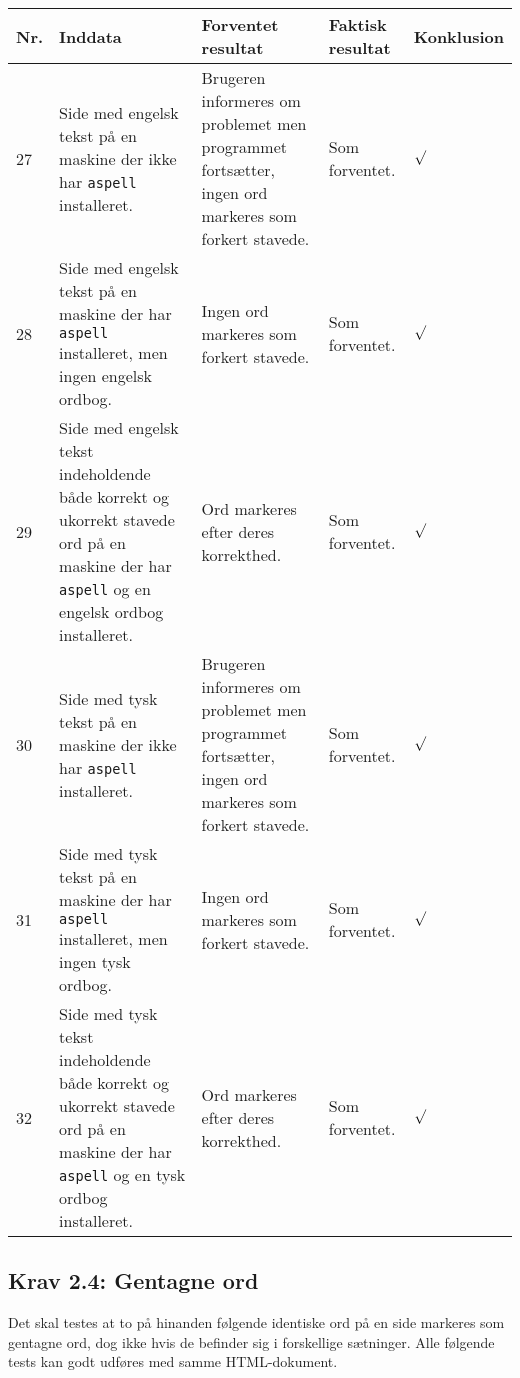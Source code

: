 \documentclass[a4paper,oneside,article]{memoir}
\begin{document}
\begin{landscape}
\begin{longtable}[c]{p{20pt}|p{220pt}|p{130pt}|p{130pt}|p{50pt}}
\textbf{Nr.} &
\textbf{Inddata} &
\textbf{Forventet resultat} &
\textbf{Faktisk resultat} &
\textbf{Konklusion} \\ \hline

27 &
Side med engelsk tekst på en maskine der ikke har \texttt{aspell}
installeret. &
Brugeren informeres om problemet men programmet fortsætter, ingen ord
markeres som forkert stavede. &
Som forventet. &
$\surd$ \\ \hline

28 &
Side med engelsk tekst på en maskine der har \texttt{aspell}
installeret, men ingen engelsk ordbog. &
Ingen ord markeres som forkert stavede. &
Som forventet. &
$\surd$ \\ \hline

29 &
Side med engelsk tekst indeholdende både korrekt og ukorrekt stavede ord
på en maskine der har \texttt{aspell} og en engelsk ordbog
installeret. &
Ord markeres efter deres korrekthed. &
Som forventet. &
$\surd$ \\ \hline

30 &
Side med tysk tekst på en maskine der ikke har \texttt{aspell}
installeret. &
Brugeren informeres om problemet men programmet fortsætter, ingen ord
markeres som forkert stavede. &
Som forventet. &
$\surd$ \\ \hline

31 &
Side med tysk tekst på en maskine der har \texttt{aspell}
installeret, men ingen tysk ordbog. &
Ingen ord markeres som forkert stavede. &
Som forventet. &
$\surd$ \\ \hline

32 &
Side med tysk tekst indeholdende både korrekt og ukorrekt stavede ord
på en maskine der har \texttt{aspell} og en tysk ordbog installeret. &
Ord markeres efter deres korrekthed. &
Som forventet. &
$\surd$ \\ \hline

\end{longtable}

\subsection{Krav 2.4: Gentagne ord}

Det skal testes at to på hinanden følgende identiske ord på en side
markeres som gentagne ord, dog ikke hvis de befinder sig i forskellige
sætninger. Alle følgende tests kan godt udføres med samme
HTML-dokument.


\end{landscape}
\end{document}
